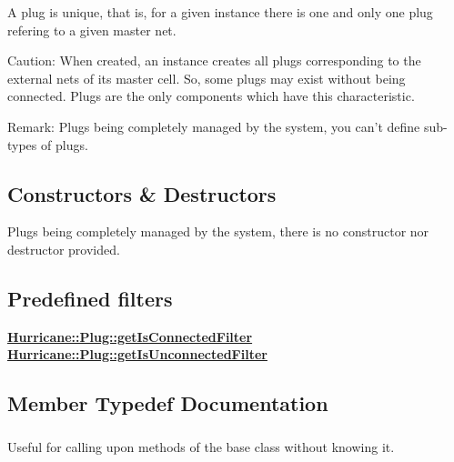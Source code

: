 A plug is unique, that is, for a given instance there is one and only one plug refering to a given master net.

\begin{DoxyParagraph}{Caution\-:}
When created, an instance creates all plugs corresponding to the external nets of its master cell. So, some plugs may exist without being connected. Plugs are the only components which have this characteristic.
\end{DoxyParagraph}
\begin{DoxyParagraph}{Remark\-:}
Plugs being completely managed by the system, you can't define sub-\/types of plugs.
\end{DoxyParagraph}
\hypertarget{classHurricane_1_1Plug_secPlugConstructors}{}\subsection{Constructors \& Destructors}\label{classHurricane_1_1Plug_secPlugConstructors}
Plugs being completely managed by the system, there is no constructor nor destructor provided.\hypertarget{classHurricane_1_1Plug_secPlugPredefinedFilters}{}\subsection{Predefined filters}\label{classHurricane_1_1Plug_secPlugPredefinedFilters}
{\bfseries \hyperlink{classHurricane_1_1Plug_a51bd5d04a337544709950d7cace05f0d}{Hurricane\-::\-Plug\-::get\-Is\-Connected\-Filter}} {\bfseries \hyperlink{classHurricane_1_1Plug_af27b873ed2420329a63ea67dcc243f07}{Hurricane\-::\-Plug\-::get\-Is\-Unconnected\-Filter}} 

\subsection{Member Typedef Documentation}
\hypertarget{classHurricane_1_1Plug_a71bee60105cbd9fdc5f0f2e5b793eeca}{
\subsubsection[{Inherit}]{}}\label{classHurricane_1_1Plug_a71bee60105cbd9fdc5f0f2e5b793eeca}
Useful for calling upon methods of the base class without knowing it. 

